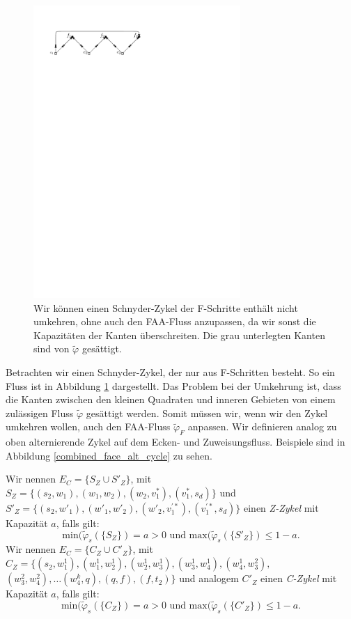 \begin{figure}[h]
\centering
\includegraphics[width=0.7\textwidth]{G_kreis.pdf}
\caption{Wir können einen Schnyder-Zykel der F-Schritte enthält nicht umkehren, ohne auch den FAA-Fluss anzupassen, da wir sonst die Kapazitäten der Kanten überschreiten. Die grau unterlegten Kanten sind von $\tilde{\varphi}$ gesättigt.}
\label{G_turn}
\end{figure}

Betrachten wir einen Schnyder-Zykel, der nur aus F-Schritten besteht. So ein Fluss ist in Abbildung \ref{G_turn} dargestellt. Das Problem bei der Umkehrung ist, dass die Kanten zwischen den kleinen Quadraten und inneren Gebieten von einem zulässigen Fluss $\tilde{\varphi}$ gesättigt werden. Somit müssen wir, wenn wir den Zykel umkehren wollen, auch den FAA-Fluss $\tilde{\varphi}_F$ anpassen. Wir definieren analog zu oben alternierende Zykel auf dem Ecken- und Zuweisungsfluss. Beispiele sind in Abbildung \ref{combined_face_alt_cycle} zu sehen.

\begin{definition}
Wir nennen $E_C=\{S_Z \cup S'_Z\}$, mit  $S_Z = \{(s_2,w_1),(w_1,w_2),(w_2,v_1^*),(v_1^*,s_d)\}$ und $S'_Z=\{(s_2,w'_1),(w'_1,w'_2),(w'_2,v^{'*}_1),(v^{'*}_1,s_d)\}$ einen \textit{Z-Zykel} mit Kapazität $a$, falls gilt: 
$$\text{min}(\tilde{\varphi}_s(\{S_Z\}) = a > 0 \text{ und } \text{max}(\tilde{\varphi}_s(\{S'_Z\}) \leq 1 - a.$$
Wir nennen $E_C=\{C_Z \cup C'_Z\}$, mit  $C_Z = \{(s_2,w^1_1), (w^1_1,w^1_2), (w^1_2,w^1_3), (w^1_3,w^1_4), (w^1_4,w^2_3), $ $(w^2_3,w^2_4), \ldots (w^k_4,q),(q,f),(f,t_2)\}$ und analogem $C'_Z$ einen \textit{C-Zykel} mit Kapazität $a$, falls gilt: 
$$\text{min}(\tilde{\varphi}_s(\{C_Z\}) = a > 0 \text{ und } \text{max}(\tilde{\varphi}_s(\{C'_Z\}) \leq 1 - a.$$
\end{definition}

